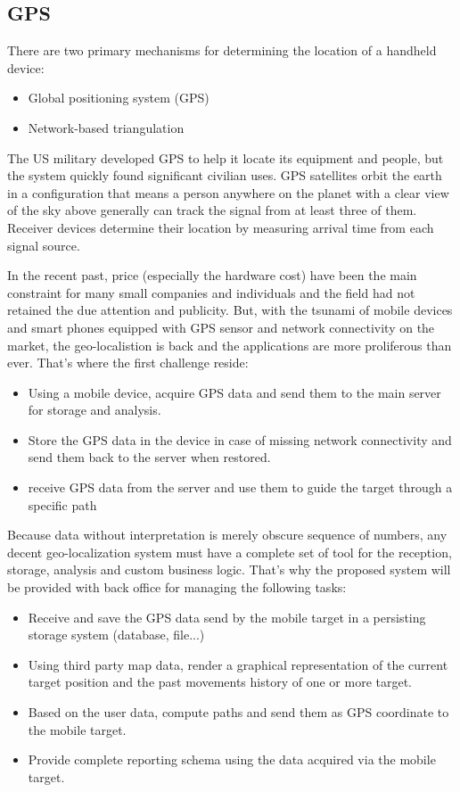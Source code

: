 \subsection{GPS}
There are two primary mechanisms for determining the location of a handheld
device:
\begin{itemize}
  \item Global positioning system (GPS)
  \item Network-based triangulation
\end{itemize}

The US military developed GPS to help it locate its equipment and people, but
the system quickly found significant civilian uses. GPS satellites orbit the
earth in a configuration that means a person anywhere on the planet with a clear
view of the sky above generally can track the signal from at least three of
them. Receiver devices determine their location by measuring arrival time from
each signal source.

In the recent past, price (especially the hardware cost) have been the main
constraint for many small companies and individuals and the field had not
retained the due attention and publicity. But, with the tsunami of mobile
devices and smart phones equipped with GPS sensor and network connectivity on
the market, the geo-localistion is back and the applications are more
proliferous than ever. That's where the first challenge reside:
\begin{itemize}
\item Using a mobile device, acquire GPS data and send them to the main server
for storage and analysis.
\item Store the GPS data in the device in case of missing network connectivity
and send them back to the server when restored.
\item receive GPS data from the server and use them to guide the target through
a specific path
\end{itemize}

Because data without interpretation is merely obscure sequence of numbers, any
decent geo-localization system must have a complete set of tool for the
reception, storage, analysis and custom business logic. That's why the proposed
system will be provided with back office for managing the following tasks:
\begin{itemize}
\item Receive and save the GPS data send by the mobile target in a persisting
storage system (database, file...)
\item Using third party map data, render a graphical representation of the
current target position and the past movements history of one or more target.
\item Based on the user data, compute paths and send them as GPS coordinate to
the mobile target.
\item Provide complete reporting schema using the data acquired via the mobile
target.
\end{itemize}